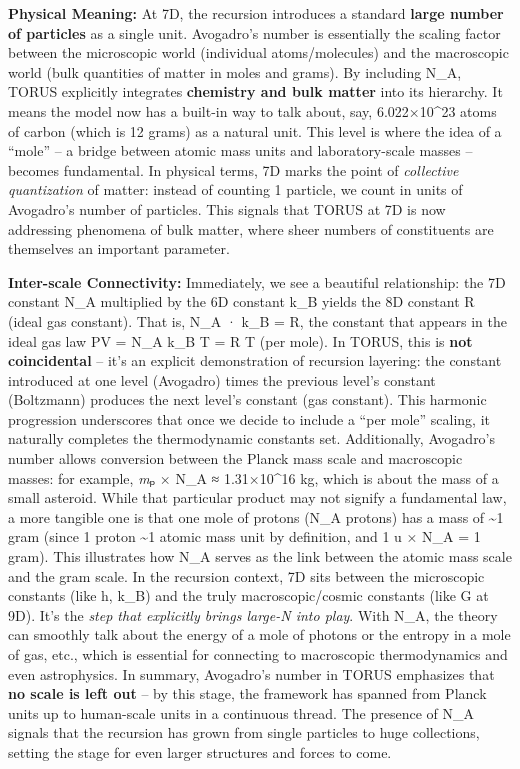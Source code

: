 \textbf{Physical Meaning:} At 7D, the recursion introduces a standard
\textbf{large number of particles} as a single unit. Avogadro's number
is essentially the scaling factor between the microscopic world
(individual atoms/molecules) and the macroscopic world (bulk quantities
of matter in moles and grams)​. By including N\_A, TORUS explicitly
integrates \textbf{chemistry and bulk matter} into its hierarchy. It
means the model now has a built-in way to talk about, say,
6.022×10\^{}23 atoms of carbon (which is 12 grams) as a natural unit.
This level is where the idea of a ``mole'' -- a bridge between atomic
mass units and laboratory-scale masses -- becomes fundamental. In
physical terms, 7D marks the point of \emph{collective quantization} of
matter: instead of counting 1 particle, we count in units of Avogadro's
number of particles. This signals that TORUS at 7D is now addressing
phenomena of bulk matter, where sheer numbers of constituents are
themselves an important parameter.

\textbf{Inter-scale Connectivity:} Immediately, we see a beautiful
relationship: the 7D constant N\_A multiplied by the 6D constant k\_B
yields the 8D constant R (ideal gas constant)​. That is, N\_A · k\_B =
R, the constant that appears in the ideal gas law PV = N\_A k\_B T = R T
(per mole). In TORUS, this is \textbf{not coincidental} -- it's an
explicit demonstration of recursion layering: the constant introduced at
one level (Avogadro) times the previous level's constant (Boltzmann)
produces the next level's constant (gas constant)​. This harmonic
progression underscores that once we decide to include a ``per mole''
scaling, it naturally completes the thermodynamic constants set.
Additionally, Avogadro's number allows conversion between the Planck
mass scale and macroscopic masses: for example, \emph{m}ₚ × N\_A ≈
1.31×10\^{}16 kg​, which is about the mass of a small asteroid. While
that particular product may not signify a fundamental law, a more
tangible one is that one mole of protons (N\_A protons) has a mass of
\textasciitilde{}1 gram (since 1 proton \textasciitilde{}1 atomic mass
unit by definition, and 1 u × N\_A = 1 gram). This illustrates how N\_A
serves as the link between the atomic mass scale and the gram scale​. In
the recursion context, 7D sits between the microscopic constants (like
h, k\_B) and the truly macroscopic/cosmic constants (like G at 9D). It's
the \emph{step that explicitly brings large-N into play}. With N\_A, the
theory can smoothly talk about the energy of a mole of photons or the
entropy in a mole of gas, etc., which is essential for connecting to
macroscopic thermodynamics and even astrophysics. In summary, Avogadro's
number in TORUS emphasizes that \textbf{no scale is left out} -- by this
stage, the framework has spanned from Planck units up to human-scale
units in a continuous thread​. The presence of N\_A signals that the
recursion has grown from single particles to huge collections, setting
the stage for even larger structures and forces to come.

